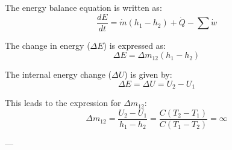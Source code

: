The energy balance equation is written as:  
\[
\frac{dE}{dt} = \dot{m}(h_1 - h_2) + \dot{Q} - \sum \dot{w}
\]  

The change in energy (\( \Delta E \)) is expressed as:  
\[
\Delta E = \Delta m_{12}(h_1 - h_2)
\]  

The internal energy change (\( \Delta U \)) is given by:  
\[
\Delta E = \Delta U = U_2 - U_1
\]  

This leads to the expression for \( \Delta m_{12} \):  
\[
\Delta m_{12} = \frac{U_2 - U_1}{h_1 - h_2} = \frac{C(T_2 - T_1)}{C(T_1 - T_2)} = \infty
\]  

---